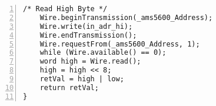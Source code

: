 \begin{lstlisting}[numbers=left,basicstyle=\tiny,caption={Zdrojový kód súboru AeroShield.cpp.},captionpos=b]
	/* Read High Byte */
	Wire.beginTransmission(_ams5600_Address);       
	Wire.write(in_adr_hi);                    
	Wire.endTransmission();                       
	Wire.requestFrom(_ams5600_Address, 1);        
	while (Wire.available() == 0);               
	word high = Wire.read();                    
	high = high << 8;                             
	retVal = high | low;
	return retVal;                                
}	
\end{lstlisting}